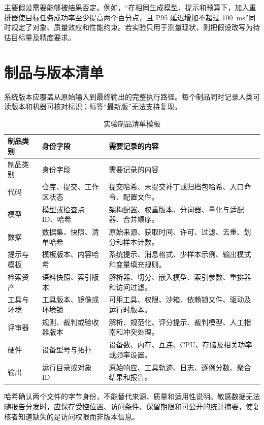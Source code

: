 \documentclass[../textbook.tex]{subfiles}
\begin{document}
主要假设需要能够被结果否定。例如，“在相同生成模型、提示和预算下，加入重排器使目标任务成功率至少提高两个百分点，且 P95 延迟增加不超过 \SI{100}{\milli\second}”同时规定了对象、质量效应和性能约束。若实验只用于测量现状，则把假设改写为待估目标量及精度要求。

\section{制品与版本清单}

系统版本应覆盖从原始输入到最终输出的完整执行路径。每个制品同时记录人类可读版本和机器可核对标识；标签“最新版”无法支持复现。

\begin{longtable}{@{}p{.23\linewidth}p{.29\linewidth}p{.39\linewidth}@{}}
\caption{实验制品清单模板}\label{tab:appendix-artifact-manifest}\\
\toprule
制品类别 & 身份字段 & 需要记录的内容\\\midrule
\endfirsthead
\toprule
制品类别 & 身份字段 & 需要记录的内容\\\midrule
\endhead
代码 & 仓库、提交、工作区状态 & 提交哈希、未提交补丁或归档包哈希、入口命令、配置文件。\\
模型 & 模型或检查点 ID、哈希 & 架构配置、权重版本、分词器、量化与适配器、合并顺序。\\
数据 & 数据集、快照、清单哈希 & 原始来源、获取时间、许可、过滤、去重、划分和样本计数。\\
提示与模板 & 模板版本、内容哈希 & 系统提示、消息格式、少样本示例、输出模式和变量填充规则。\\
检索资产 & 语料快照、索引版本 & 解析器、切分、嵌入模型、索引参数、重排器和访问过滤。\\
工具与环境 & 工具版本、镜像或环境锁 & 可用工具、权限、沙箱、依赖锁文件、驱动及运行时版本。\\
评审器 & 规则、裁判或验收器版本 & 解析、规范化、评分提示、裁判模型、人工指南和冲突处理。\\
硬件 & 设备型号与拓扑 & 设备数、内存、互连、CPU、存储及相关功率或频率设置。\\
输出 & 运行目录或对象 ID & 原始响应、工具轨迹、日志、逐例分数、聚合结果和报告。\\
\bottomrule
\end{longtable}

哈希确认两个文件的字节身份，不能替代来源、质量和适用性说明。敏感数据无法随报告分发时，应保存受控位置、访问条件、保留期限和可公开的统计摘要，使复核者知道缺失的是访问权限而非版本信息。
\end{document}
